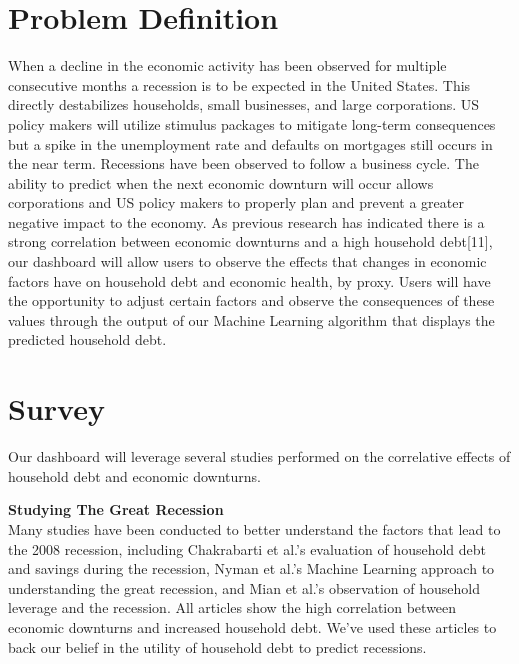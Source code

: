 \documentclass[sigconf,nonacm,11pt]{acmart}
\begin{document}
\section{Problem Definition}

When a decline in the economic activity has been observed for multiple consecutive months a recession is to be expected in the United States. This directly destabilizes households, small businesses, and large corporations. US policy makers will utilize stimulus packages to mitigate long-term consequences but a spike in the unemployment rate and defaults on mortgages still occurs in the near term. Recessions have been observed to follow a business cycle. The ability to predict when the next economic downturn will occur allows corporations and US policy makers to properly plan and prevent a greater negative impact to the economy. As previous research has indicated there is a strong correlation between economic downturns and a high household debt[11], our dashboard will allow users to observe the effects that changes in economic factors have on household debt and economic health, by proxy.  Users will have the opportunity to adjust certain factors and observe the consequences of these values through the output of our Machine Learning algorithm that displays the predicted household debt. \vspace{-1em}

\section{Survey}

Our dashboard will leverage several studies performed on the correlative effects of household debt and economic downturns.\\
\vspace{0.25em}

\textbf{Studying The Great Recession}\\
Many studies have been conducted to better understand the factors that lead to the 2008 recession, including Chakrabarti et al.'s evaluation of household debt and savings during the recession\cite{Chakrabarti2015}, Nyman et al.'s Machine Learning approach to understanding the great recession\cite{Nyman2018}, and Mian et al.'s observation of household leverage and the recession\cite{Mian2010}.  All articles show the high correlation between economic downturns and increased household debt. We've used these articles to back our belief in the utility of household debt to predict recessions.\\
\vspace{0.25em}
\end{document}

